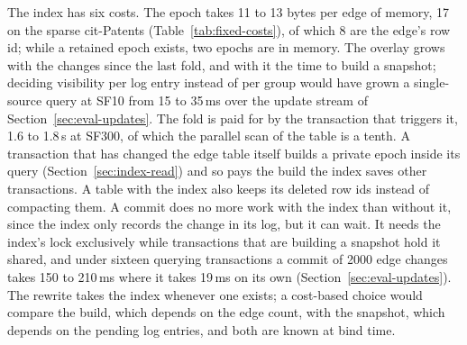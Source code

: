 The index has six costs. The epoch takes 11 to 13 bytes per edge of memory, 17 on the sparse cit-Patents (Table~\ref{tab:fixed-costs}), of which 8 are the edge's row id; while a retained epoch exists, two epochs are in memory. The
overlay grows with the changes since the last fold, and with it the time to build a snapshot; deciding visibility per
log entry instead of per group would have grown a single-source query at SF10 from 15 to 35\,ms over the update stream of Section~\ref{sec:eval-updates}. The fold is paid for by the
transaction that triggers it, 1.6 to 1.8\,s at SF300, of which the parallel scan of the table is a tenth. A transaction that has changed the edge table itself builds a private epoch inside its query
(Section~\ref{sec:index-read}) and so pays the build the index saves other transactions. A
table with the index also keeps its deleted row ids instead of compacting them. A commit does no more work with the index than without it, since the index only records the change in its log, but it can wait. It needs the index's lock exclusively while transactions that are building a snapshot hold it shared, and under sixteen querying transactions a commit of 2000 edge changes takes 150 to 210\,ms where it takes 19\,ms on its own (Section~\ref{sec:eval-updates}). The rewrite takes the index whenever one exists; a cost-based choice would compare the build, which depends on the edge count, with the snapshot, which depends on the pending log entries, and both are known at bind time.
